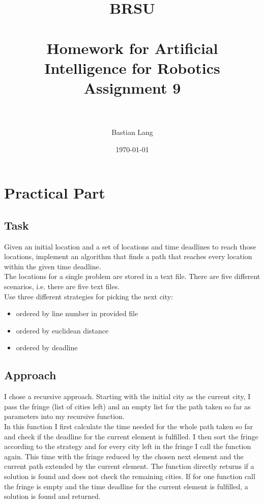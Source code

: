 \documentclass[paper=a4, fontsize=11pt]{scrartcl} %
\title{	
\normalfont \normalsize 
\textsc{BRSU} \\ [25pt] %
\horrule{0.5pt} \\[0.4cm] %
\huge Homework for Artificial Intelligence for Robotics\\Assignment 9 \\ %
\horrule{2pt} \\[0.5cm] %
}
\author{Bastian Lang} %
\date{\normalsize\today} %
\numberwithin{equation}{section} %
\numberwithin{figure}{section} %
\numberwithin{table}{section} %
\begin{document}
\maketitle %


\section{Practical Part}

\subsection{Task}
Given an initial location and a set of locations and time deadlines to reach those locations, implement an algorithm that finds a path that reaches every location within the given time deadline.\\
The locations for a single problem are stored in a text file. There are five different scenarios, i.e. there are five text files.\\
Use three different strategies for picking the next city:
\begin{itemize}
\item ordered by line number in provided file
\item ordered by euclidean distance
\item ordered by deadline
\end{itemize}


\subsection{Approach}
I chose a recursive approach. Starting with the initial city as the current city, I pass the fringe (list of cities left) and an empty list for the path taken so far as parameters into my recursive function.\\
In this function I first calculate the time needed for the whole path taken so far and check if the deadline for the current element is fulfilled. I then sort the fringe according to the strategy and for every city left in the fringe I call the function again. This time with the fringe reduced by the chosen next element and the current path extended by the current element. The function directly returns if a solution is found and does not check the remaining cities. If for one function call the fringe is empty and the time deadline for the current element is fulfilled, a solution is found and returned.
\end{document}
